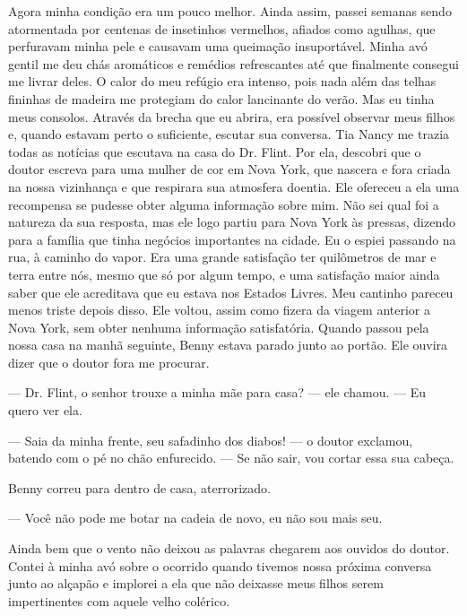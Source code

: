 Agora minha condição era um pouco
melhor. Ainda assim, passei semanas sendo atormentada por centenas de
insetinhos vermelhos, afiados como agulhas, que perfuravam minha pele e
causavam uma queimação insuportável. Minha avó gentil me deu chás
aromáticos e remédios refrescantes até que finalmente consegui me livrar
deles. O calor do meu refúgio era intenso, pois nada além das telhas
fininhas de madeira me protegiam do calor lancinante do verão. Mas eu
tinha meus consolos. Através da brecha que eu abrira, era possível
observar meus filhos e, quando estavam perto o suficiente, escutar sua
conversa. Tia Nancy me trazia todas as notícias que escutava na casa do
Dr. Flint. Por ela, descobri que o doutor escreva para uma mulher de cor
em Nova York, que nascera e fora criada na nossa vizinhança e que
respirara sua atmosfera doentia. Ele ofereceu a ela uma recompensa se
pudesse obter alguma informação sobre mim. Não sei qual foi a natureza
da sua resposta, mas ele logo partiu para Nova York às pressas, dizendo
para a família que tinha negócios importantes na cidade. Eu o espiei
passando na rua, à caminho do vapor. Era uma grande satisfação ter
quilômetros de mar e terra entre nós, mesmo que só por algum tempo, e
uma satisfação maior ainda saber que ele acreditava que eu estava nos
Estados Livres. Meu cantinho pareceu menos triste depois disso. Ele
voltou, assim como fizera da viagem anterior a Nova York, sem obter
nenhuma informação satisfatória. Quando passou pela nossa casa na manhã
seguinte, Benny estava parado junto ao portão. Ele ouvira dizer que o
doutor fora me procurar.

--- Dr. Flint, o senhor trouxe a minha mãe para casa? --- ele chamou.
--- Eu quero ver ela.

--- Saia da minha frente, seu safadinho dos diabos! --- o doutor
exclamou, batendo com o pé no chão enfurecido. --- Se não sair, vou
cortar essa sua cabeça.

Benny correu para dentro de casa,
aterrorizado.

--- Você não pode me botar na cadeia de novo, eu não sou mais seu.

Ainda bem que o vento não deixou as palavras chegarem aos ouvidos do
doutor. Contei à minha avó sobre o ocorrido quando tivemos nossa próxima
conversa junto ao alçapão e implorei a ela que não deixasse meus filhos
serem impertinentes com aquele velho colérico.

